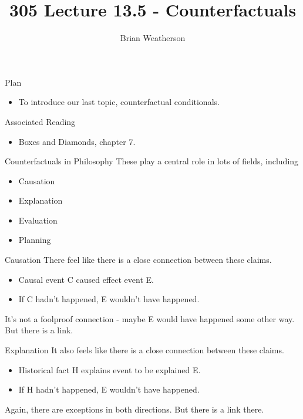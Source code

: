 \documentclass[
  ignorenonframetext,
]{beamer}
\title{305 Lecture 13.5 - Counterfactuals}
\author{Brian Weatherson}
\date{}
\providecommand{\tightlist}{%
  \setlength{\itemsep}{0pt}\setlength{\parskip}{0pt}}
\renewcommand{\,}{\text{, }}
\begin{document}
\frame{\titlepage}

\begin{frame}{Plan}
\protect\hypertarget{plan}{}
\begin{itemize}
\tightlist
\item
  To introduce our last topic, counterfactual conditionals.
\end{itemize}
\end{frame}

\begin{frame}{Associated Reading}
\protect\hypertarget{associated-reading}{}
\begin{itemize}
\tightlist
\item
  Boxes and Diamonds, chapter 7.
\end{itemize}
\end{frame}

\begin{frame}{Counterfactuals in Philosophy}
\protect\hypertarget{counterfactuals-in-philosophy}{}
These play a central role in lots of fields, including

\begin{itemize}
\tightlist
\item
  Causation
\item
  Explanation
\item
  Evaluation
\item
  Planning
\end{itemize}
\end{frame}

\begin{frame}{Causation}
\protect\hypertarget{causation}{}
There feel like there is a close connection between these claims.

\begin{itemize}
\tightlist
\item
  Causal event C caused effect event E.
\item
  If C hadn't happened, E wouldn't have happened.
\end{itemize}

It's not a foolproof connection - maybe E would have happened some other
way. But there is a link.
\end{frame}

\begin{frame}{Explanation}
\protect\hypertarget{explanation}{}
It also feels like there is a close connection between these claims.

\begin{itemize}
\tightlist
\item
  Historical fact H explains event to be explained E.
\item
  If H hadn't happened, E wouldn't have happened.
\end{itemize}

Again, there are exceptions in both directions. But there is a link
there.
\end{frame}
\end{document}
